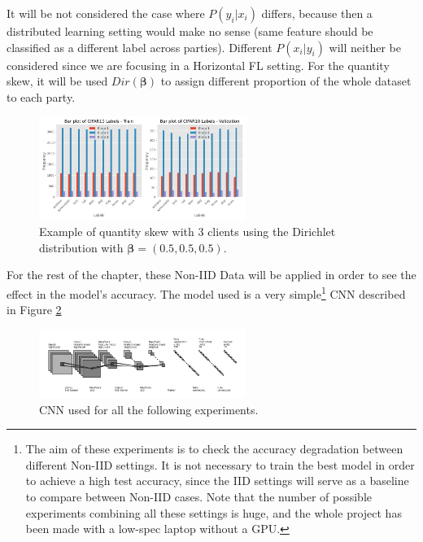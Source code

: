 It will be not considered the case where $P(y_i | x_i)$ differs, because then a distributed learning setting would make no sense (same feature should be classified as a different label across parties). Different $P(x_i | y_i)$ will neither be considered since we are focusing in a Horizontal FL setting. For the quantity skew, it will be used $Dir(\boldsymbol{\beta})$ to assign different proportion of the whole dataset to each party.

\begin{figure}[H]
  \centering
  \includegraphics[width=0.6\textwidth]{figures/2-Federated_Learning/Example_Quantity_skew_3_clients.png}
  \caption{Example of quantity skew with 3 clients using the Dirichlet distribution with $\boldsymbol{\beta}=(0.5, 0.5, 0.5)$.}
  \label{fig:Quantity_skew_Dir_05}
\end{figure}

For the rest of the chapter, these Non-IID Data will be applied in order to see the effect in the model's accuracy. The model used is a very simple\footnote{The aim of these experiments is to check the accuracy degradation between different Non-IID settings. It is not necessary to train the best model in order to achieve a high test accuracy, since the IID settings will serve as a baseline to compare between Non-IID cases. Note that the number of possible experiments combining all these settings is huge, and the whole project has been made with a low-spec laptop without a GPU.} CNN described in Figure \ref{fig:CNN_used}

\begin{figure}[H]
  \centering
  \includegraphics[width=0.6\textwidth]{figures/2-Federated_Learning/convnet_model.png}
  \caption{CNN used for all the following experiments.}
  \label{fig:CNN_used}
\end{figure}



